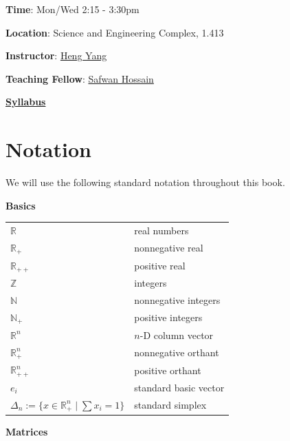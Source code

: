 \documentclass[
]{book}
\theoremstyle{definition}
\theoremstyle{definition}
\theoremstyle{definition}
\theoremstyle{definition}
\theoremstyle{remark}
\begin{document}
\textbf{Time}: Mon/Wed 2:15 - 3:30pm

\textbf{Location}: Science and Engineering Complex, 1.413

\textbf{Instructor}: \href{https://hankyang.seas.harvard.edu/}{Heng Yang}

\textbf{Teaching Fellow}: \href{https://safwanhossain.github.io/}{Safwan Hossain}

\href{https://docs.google.com/document/d/1H6Wqht_PVw_n8Jl0kXN3HjZfHkeZJYqYWT4ayxvqRlU/edit?usp=sharing}{\textbf{Syllabus}}

\hypertarget{notation}{%
\chapter*{Notation}\label{notation}}

We will use the following standard notation throughout this book.

\textbf{Basics}

\begin{longtable}[]{@{}
  >{\raggedright\arraybackslash}p{}
  >{\raggedright\arraybackslash}p{}@{}}
\toprule()
\endhead
\(\mathbb{R}^{}\) & real numbers \\
\(\mathbb{R}^{}_{+}\) & nonnegative real \\
\(\mathbb{R}^{}_{++}\) & positive real \\
\(\mathbb{Z}\) & integers \\
\(\mathbb{N}\) & nonnegative integers \\
\(\mathbb{N}_{+}\) & positive integers \\
\(\mathbb{R}^{n}\) & \(n\)-D column vector \\
\(\mathbb{R}^{n}_{+}\) & nonnegative orthant \\
\(\mathbb{R}^{n}_{++}\) & positive orthant \\
\(e_i\) & standard basic vector \\
\(\Delta_n := \{x \in \mathbb{R}^n_{+} \mid \sum x_i = 1 \}\) & standard simplex \\
\bottomrule()
\end{longtable}

\textbf{Matrices}
\end{document}
